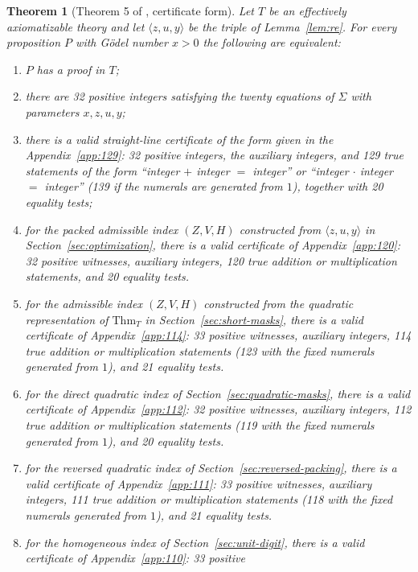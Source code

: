 \documentclass[11pt,letterpaper]{article}
\newtheorem{theorem}{Theorem}[section]
\theoremstyle{definition}
\theoremstyle{remark}
\numberwithin{equation}{section}
\begin{document}
\begin{theorem}[Theorem 5 of \cite{J80}, certificate form]\label{thm:5}
Let $T$ be an effectively axiomatizable theory and let $\langle z,u,y\rangle$
be the triple of Lemma~\ref{lem:re}. For every proposition $P$ with G\"odel
number $x>0$ the following are equivalent:
\begin{enumerate}[nosep,label=\textup{(\alph*)}]
\item $P$ has a proof in $T$;
\item there are 32 positive integers satisfying the twenty equations of
 $\Sigma$ with parameters $x,z,u,y$;
\item there is a valid straight-line certificate of the form given in the
 Appendix~\ref{app:129}: 32 positive integers, the auxiliary integers, and 129 true
 statements of the form ``integer $+$ integer $=$ integer'' or
 ``integer $\cdot$ integer $=$ integer'' \textup{(}139 if the numerals are
 generated from $1$\textup{)}, together with 20 equality tests;
\item for the packed admissible index $(Z,V,H)$ constructed from
 $\langle z,u,y\rangle$ in Section~\ref{sec:optimization}, there is a valid
 certificate of Appendix~\ref{app:120}: 32 positive witnesses, auxiliary
 integers, 120 true addition or multiplication statements, and 20 equality
 tests.
\item for the admissible index $(Z,V,H)$ constructed from the quadratic
 representation of $\mathrm{Thm}_T$ in Section~\ref{sec:short-masks},
 there is a valid certificate of Appendix~\ref{app:114}: 33 positive
 witnesses, auxiliary integers, 114 true addition or multiplication
 statements \textup{(}123 with the fixed numerals generated from
 $1$\textup{)}, and 21 equality tests.
\item for the direct quadratic index of Section~\ref{sec:quadratic-masks},
 there is a valid certificate of Appendix~\ref{app:112}: 32 positive
 witnesses, auxiliary integers, 112 true addition or multiplication
 statements \textup{(}119 with the fixed numerals generated from
 $1$\textup{)}, and 20 equality tests.
\item for the reversed quadratic index of Section~\ref{sec:reversed-packing},
 there is a valid certificate of Appendix~\ref{app:111}: 33 positive
 witnesses, auxiliary integers, 111 true addition or multiplication
 statements \textup{(}118 with the fixed numerals generated from
 $1$\textup{)}, and 21 equality tests.
\item for the homogeneous index of Section~\ref{sec:unit-digit},
 there is a valid certificate of Appendix~\ref{app:110}: 33 positive

\end{enumerate}
\end{theorem}
\end{document}

